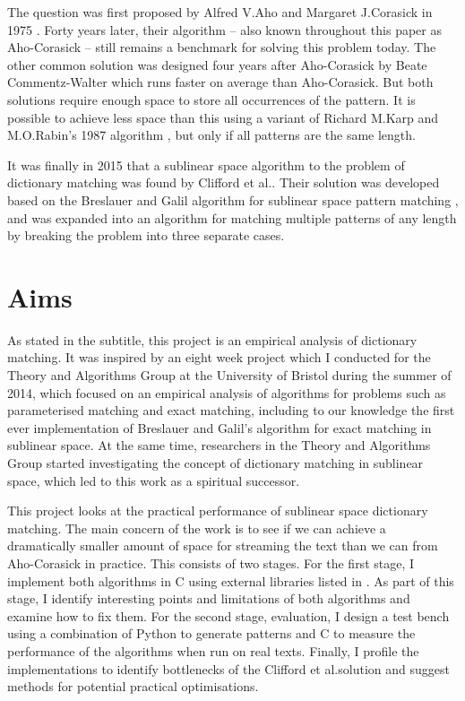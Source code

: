 \documentclass[ %
                    author={Dominic Joseph Moylett},
                    degree={MEng},
                     title={Dictionary Matching with Fingerprints},
                  subtitle={An Empirical Analysis},
                      type={research},
                      year={2015} ]{dissertation}
\begin{document}
The question was first proposed by Alfred V.\@ Aho and Margaret J.\@ Corasick in 1975 \cite{Aho:1975:ESM:360825.360855}. Forty years later, their algorithm -- also known throughout this paper as Aho-Corasick -- still remains a benchmark for solving this problem today. The other common solution was designed four years after Aho-Corasick by Beate Commentz-Walter \cite{commentz-walter:algo} which runs faster on average than Aho-Corasick. But both solutions require enough space to store all occurrences of the pattern. It is possible to achieve less space than this using a variant of Richard M.\@ Karp and M.\@ O.\@ Rabin's 1987 algorithm \cite{5390135}, but only if all patterns are the same length.

It was finally in 2015 that a sublinear space algorithm to the problem of dictionary matching was found by Clifford et al.\@ \cite{2015arXiv150406242C}. Their solution was developed based on the Breslauer and Galil algorithm for sublinear space pattern matching \cite{Breslauer:2014:RSS:2660854.2635814}, and was expanded into an algorithm for matching multiple patterns of any length by breaking the problem into three separate cases.

\section{Aims}

As stated in the subtitle, this project is an empirical analysis of dictionary matching. It was inspired by an eight week project which I conducted for the Theory and Algorithms Group at the University of Bristol during the summer of 2014, which focused on an empirical analysis of algorithms for problems such as parameterised matching and exact matching, including to our knowledge the first ever implementation of Breslauer and Galil's algorithm for exact matching in sublinear space. At the same time, researchers in the Theory and Algorithms Group started investigating the concept of dictionary matching in sublinear space, which led to this work as a spiritual successor.

This project looks at the practical performance of sublinear space dictionary matching. The main concern of the work is to see if we can achieve a dramatically smaller amount of space for streaming the text than we can from Aho-Corasick in practice. This consists of two stages. For the first stage, I implement both algorithms in C using external libraries listed in . As part of this stage, I identify interesting points and limitations of both algorithms and examine how to fix them. For the second stage, evaluation, I design a test bench using a combination of Python to generate patterns and C to measure the performance of the algorithms when run on real texts. Finally, I profile the implementations to identify bottlenecks of the Clifford et al.\@ solution and suggest methods for potential practical optimisations.
\end{document}
